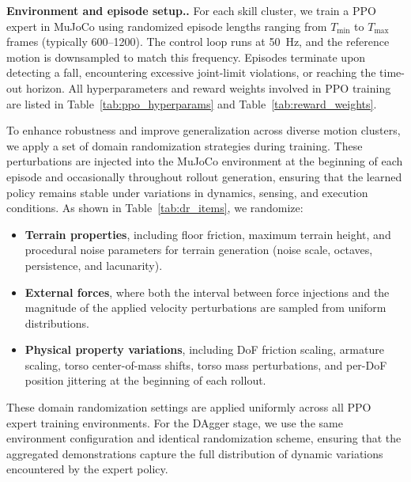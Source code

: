 \documentclass{llmxive}
\providecommand{\paragraph}[1]{\vspace{.5em}\noindent\textbf{#1.}}
\begin{document}
\paragraph{Environment and episode setup.}
For each skill cluster, we train a PPO expert in MuJoCo using randomized episode lengths ranging from $T_{\min}$ to $T_{\max}$ frames (typically 600--1200). The control loop runs at 50~Hz, and the reference motion is downsampled to match this frequency. Episodes terminate upon detecting a fall, encountering excessive joint-limit violations, or reaching the time-out horizon. All hyperparameters and reward weights involved in PPO training are listed in Table~\ref{tab:ppo_hyperparams} and Table~\ref{tab:reward_weights}.

To enhance robustness and improve generalization across diverse motion clusters, we apply a set of domain randomization strategies during training. These perturbations are injected into the MuJoCo environment at the beginning of each episode and occasionally throughout rollout generation, ensuring that the learned policy remains stable under variations in dynamics, sensing, and execution conditions. As shown in Table~\ref{tab:dr_items}, we randomize:

\begin{itemize}[leftmargin=1.5em]
\item \textbf{Terrain properties}, including floor friction, maximum terrain height, and procedural noise parameters for terrain generation (noise scale, octaves, persistence, and lacunarity).

\item \textbf{External forces}, where both the interval between force injections and the magnitude of the applied velocity perturbations are sampled from uniform distributions.

\item \textbf{Physical property variations}, including DoF friction scaling, armature scaling, torso center-of-mass shifts, torso mass perturbations, and per-DoF position jittering at the beginning of each rollout.

\end{itemize}

These domain randomization settings are applied uniformly across all PPO expert training environments. For the DAgger stage, we use the same environment configuration and identical randomization scheme, ensuring that the aggregated demonstrations capture the full distribution of dynamic variations encountered by the expert policy.
\end{document}

